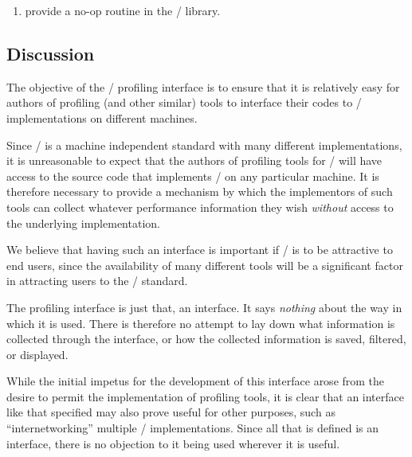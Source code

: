 \begin{enumerate}
  This separability is necessary to allow a separate profiling library to
  be correctly implemented, since (at least with Unix linker semantics) the
  profiling library must contain these wrapper functions if it is to
  perform as expected.  This requirement allows the person who builds the
  profiling library to extract these functions from the original \MPI/
  library and add them into the profiling library without bringing along
  any other unnecessary code.

\item provide a no-op routine  in the \MPI/ library.
\end{enumerate}

\subsection{Discussion}

The objective of the \MPI/ profiling interface is to ensure that it is
relatively easy for authors of profiling (and other similar) tools to
interface their codes to \MPI/ implementations on different machines.

Since \MPI/ is a machine independent standard with many different
implementations, it is unreasonable to expect that the authors of profiling
tools for \MPI/ will have access to the source code that  implements \MPI/
on any particular machine.  It is therefore necessary to provide a
mechanism by which the implementors of such tools can collect whatever
performance information they wish \emph{without} access to the underlying
implementation.

We believe that having such an interface is important if \MPI/ is to be
attractive to end users, since the availability of many different tools
will be a significant factor in attracting users to the \MPI/ standard.

The profiling interface is just that, an interface.  It says \emph{nothing}
about the way in which it is used.  There is therefore no attempt to lay
down what information is collected through the interface, or how the
collected information is saved, filtered, or displayed.

While the initial impetus for the development of this interface arose from
the desire to permit the implementation of profiling tools, it is clear
that an interface like that specified may also prove useful for other
purposes, such as ``internetworking'' multiple \MPI/ implementations.
Since all that is defined is an interface, there is no objection to it
being used wherever it is useful.

